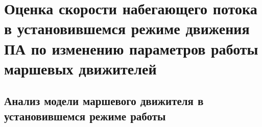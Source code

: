 \chapter{Оценка скорости набегающего потока в установившемся режиме движения ПА по изменению параметров работы маршевых движителей}\label{ch:Velocity}

\section{Анализ модели маршевого движителя в установившемся режиме работы}




